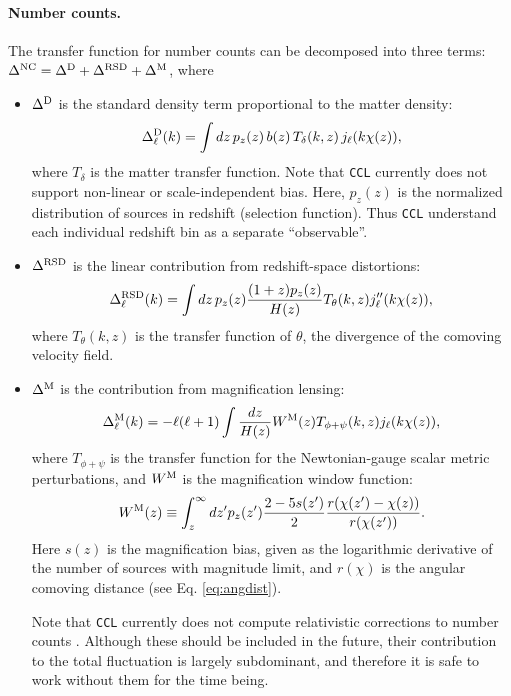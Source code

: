 \documentclass[\docopts]{\docclass}
\begin{document}
\paragraph{\bf Number counts.} The transfer function for number counts can be decomposed into three terms: $\Delta^{\rm NC}=\Delta^{\rm D}+\Delta^{\rm RSD}+\Delta^{\rm M}$, where
\begin{itemize}
  \item $\Delta^{\rm D}$ is the standard density term proportional to the matter density:
        \begin{equation}
          \Delta^{\rm D}_\ell(k)=\int dz\,p_z(z)\,b(z)\,T_\delta(k,z)\,j_\ell(k\chi(z)),
        \end{equation}
        where $T_\delta$ is the matter transfer function. Note that {\tt CCL} currently does not support non-linear or scale-independent bias. Here, $p_z(z)$ is the normalized distribution of sources in redshift (selection function). Thus {\tt CCL} understand each individual redshift bin as a separate ``observable''.
  \item $\Delta^{\rm RSD}$ is the linear contribution from redshift-space distortions:
        \begin{equation}
          \Delta^{\rm RSD}_\ell(k)=\int dz\,p_z(z)\frac{(1+z) p_z(z)}{H(z)}T_\theta(k,z) j_\ell''(k\chi(z)),
        \end{equation}
        where $T_\theta(k,z)$ is the transfer function of $\theta$, the divergence of the comoving velocity field.
  \item $\Delta^{\rm M}$ is the contribution from magnification lensing:
        \begin{equation}
          \Delta_\ell^{\rm M}(k)=-\ell(\ell+1)\int \frac{dz}{H(z)} W^{\rm M}(z) T_{\phi+\psi}(k,z) j_\ell(k\chi(z)),
        \end{equation}
        where $T_{\phi+\psi}$ is the transfer function for the Newtonian-gauge scalar metric perturbations, and $W^{\rm M}$ is the magnification window function:
        \begin{equation}
           W^{\rm M}(z)\equiv\int_z^\infty dz' p_z(z')\frac{2-5s(z')}{2}\frac{r(\chi(z')-\chi(z))}{r(\chi(z'))}.
        \end{equation}
        Here $s(z)$ is the magnification bias, given as the logarithmic derivative of the number of sources with magnitude limit, and $r(\chi)$ is the angular comoving distance (see Eq. \ref{eq:angdist}).
          
        Note that {\tt CCL} currently does not compute relativistic corrections to number counts \cite{2011PhRvD..84d3516C,2011PhRvD..84f3505B}. Although these should be included in the future, their contribution to the total fluctuation is largely subdominant, and therefore it is safe to work without them for the time being.
\end{itemize}
\end{document}
